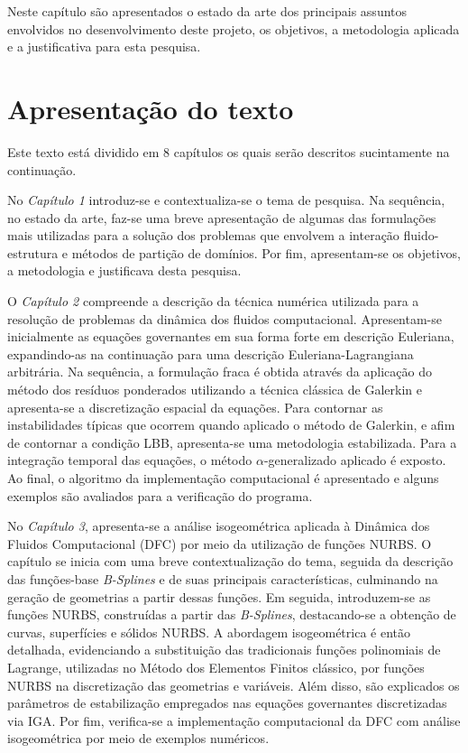 \documentclass[tese_patricia.tex]{subfiles}
\begin{document}
Neste capítulo são apresentados o estado da arte dos principais assuntos envolvidos no desenvolvimento deste projeto, os objetivos, a metodologia aplicada e a justificativa para esta pesquisa.

\section{Apresentação do texto}

Este texto está dividido em 8 capítulos os quais serão descritos sucintamente na continuação.

No \textit{Capítulo 1} introduz-se e contextualiza-se o tema de pesquisa. Na sequência, no estado da arte, faz-se uma breve apresentação de algumas das formulações mais utilizadas para a solução dos problemas que envolvem a interação fluido-estrutura e métodos de partição de domínios. Por fim, apresentam-se os objetivos, a metodologia e justificava desta pesquisa.

O \textit{Capítulo 2} compreende a descrição da técnica numérica utilizada para a resolução de problemas da dinâmica dos fluidos computacional. 
Apresentam-se inicialmente as equações governantes em sua forma forte em descrição Euleriana, expandindo-as na continuação para uma descrição Euleriana-Lagrangiana arbitrária. Na sequência, a formulação fraca é obtida através da aplicação do método dos resíduos ponderados utilizando a técnica clássica de Galerkin e apresenta-se a discretização espacial da equações. Para contornar as instabilidades típicas que ocorrem quando aplicado o método de Galerkin, e afim de contornar a condição LBB, apresenta-se uma metodologia estabilizada. Para a integração temporal das equações, o método $\alpha$-generalizado aplicado é exposto. Ao final, o algoritmo da implementação computacional é apresentado e alguns exemplos são avaliados para a verificação do programa.

No \textit{Capítulo 3}, apresenta-se a análise isogeométrica aplicada à Dinâmica dos Fluidos Computacional (DFC) por meio da utilização de funções NURBS. O capítulo se inicia com uma breve contextualização do tema, seguida da descrição das funções-base \textit{B-Splines} e de suas principais características, culminando na geração de geometrias a partir dessas funções. Em seguida, introduzem-se as funções NURBS, construídas a partir das \textit{B-Splines}, destacando-se a obtenção de curvas, superfícies e sólidos NURBS. A abordagem isogeométrica é então detalhada, evidenciando a substituição das tradicionais funções polinomiais de Lagrange, utilizadas no Método dos Elementos Finitos clássico, por funções NURBS na discretização das geometrias e variáveis. Além disso, são explicados os parâmetros de estabilização empregados nas equações governantes discretizadas via IGA. Por fim, verifica-se a implementação computacional da DFC com análise isogeométrica por meio de exemplos numéricos.
\end{document}
